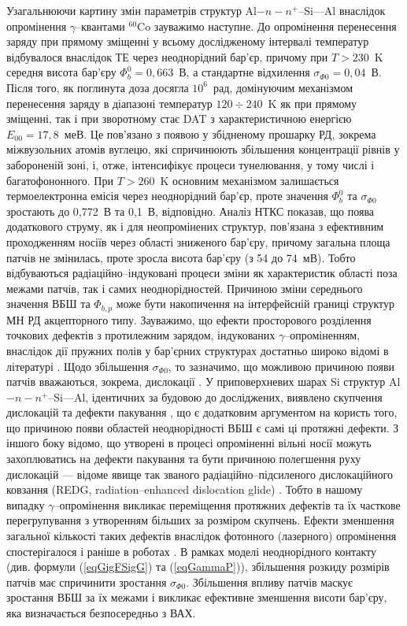 Узагальнюючи картину змін параметрів структур Al$-n-n^+$--Si---Al внаслідок опромінення $\gamma$--квантами $^{60}$Co зауважимо наступне.
До опромінення перенесення заряду при прямому зміщенні у всьому дослідженому інтервалі температур відбувалося внаслідок ТЕ через неоднорідний бар'єр,
причому при $T>230$~K середня висота бар'єру $\Phi_b^0=0,663$~В, а стандартне відхилення $\sigma_{\Phi0}=0,04$~В.
Після того, як поглинута доза досягла $10^6$~рад, домінуючим механізмом перенесення заряду в діапазоні температур
$120\div240$~K як при прямому зміщенні, так і при зворотному стає DAT з характеристичною енергією $E_{00}=17,8$~меВ.
Це пов'язано з появою у збідненому прошарку РД, зокрема міжвузольних атомів вуглецю, які спричинюють збільшення
концентрації рівнів у забороненій зоні, і, отже, інтенсифікує процеси тунелювання, у тому числі і багатофононного.
При $T>260$~K основним механізмом залишається термоелектронна емісія через неоднорідний бар'єр, проте значення $\Phi_b^0$ та $\sigma_{\Phi0}$
зростають до 0,772~В та 0,1~В, відповідно.
Аналіз НТКС показав, що поява додаткового струму, як і для неопромінених структур, пов'язана з ефективним проходженням носіїв через області зниженого бар'єру,
причому загальна площа патчів не змінилась, проте зросла висота бар'єру (з 54 до 74~мВ).
Тобто відбуваються радіаційно--індуковані процеси зміни як характеристик області поза межами патчів, так і самих неоднорідностей.
Причиною зміни середнього значення ВБШ та $\Phi_{b,p}$ може бути накопичення на інтерфейсній границі структур МН
РД акцепторного типу.
Зауважимо, що ефекти просторового розділення точкових дефектів з протилежним зарядом, індукованих $\gamma$--опроміненням, внаслідок дії пружних полів
у бар'єрних структурах достатньо широко відомі в літературі \cite{Shcherb, Muzafarova}.
Щодо збільшення $\sigma_{\Phi0}$, то зазначимо, що можливою причиною появи патчів вважаються, зокрема, дислокації \cite{GELCZUK2014}.
У приповерхневих шарах Si структур Al$-n-n^+$--Si---Al, ідентичних за будовою до досліджених, виявлено скупчення дислокацій та дефекти пакування \cite{VOROBETS2005,Vorobets},
що є додатковим аргументом на користь того, що причиною появи областей неоднорідності ВБШ є самі ці протяжні дефекти.
З іншого боку відомо, що утворені в процесі опроміненні вільні носії можуть захоплюватись на дефекти пакування та бути причиною
полегшення руху дислокацій --- відоме явище так званого радіаційно--підсиленого дислокаційного ковзання (REDG, radiation--enhanced dislocation glide) \cite{REDG}.
Тобто в нашому випадку $\gamma$--опромінення викликає переміщення протяжних дефектів та їх часткове перегрупування з утворенням більших за розміром
скупчень.
Ефекти зменшення загальної кількості таких дефектів внаслідок фотонного (лазерного) опромінення спостерігалося і раніше в роботах \cite{VOROBETS2005,Vorobets}.
В рамках моделі неоднорідного контакту (див. формули (\ref{eqGigFSigG}) та (\ref{eqGammaP})), збільшення розкиду розмірів патчів має спричинити зростання $\sigma_{\Phi0}$.
Збільшення впливу патчів маскує зростання ВБШ за їх межами і викликає ефективне зменшення висоти бар'єру, яка визначається безпосередньо з ВАХ.

